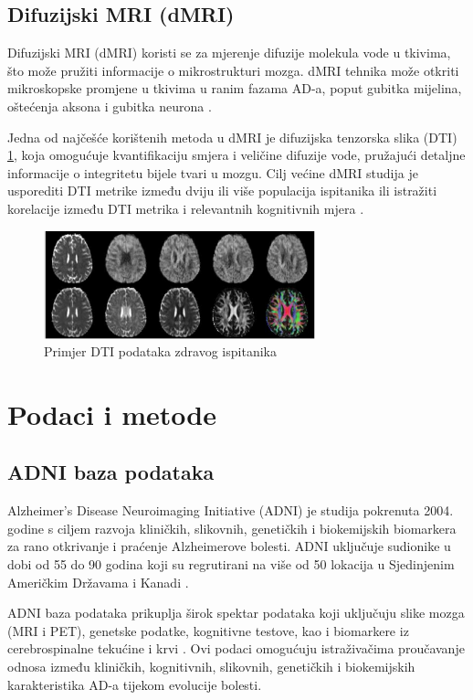 \documentclass[zavrsnirad]{fer}
\begin{document}
\subsection{Difuzijski MRI (dMRI)}
Difuzijski MRI (dMRI) koristi se za mjerenje difuzije molekula vode u tkivima, što može pružiti informacije o mikrostrukturi mozga. dMRI tehnika može otkriti mikroskopske promjene u tkivima u ranim fazama AD-a, poput gubitka mijelina, oštećenja aksona i gubitka neurona \cite{Promteangtrong2015}.

Jedna od najčešće korištenih metoda u dMRI je difuzijska tenzorska slika (DTI) \ref{fig:dMRI}, koja omogućuje kvantifikaciju smjera i veličine difuzije vode, pružajući detaljne informacije o integritetu bijele tvari u mozgu. Cilj većine dMRI studija je usporediti DTI metrike između dviju ili više populacija ispitanika ili istražiti korelacije između DTI metrika i relevantnih kognitivnih mjera \cite{mueller2015diffusion}.

\begin{figure}[h]
	\centering
	\includegraphics[width=0.7\textwidth]{Figures/dMRI.jpg}
	\caption{Primjer DTI podataka zdravog ispitanika \cite{mueller2015diffusion}}
	\label{fig:dMRI}
\end{figure}

\section{Podaci i metode}
\subsection{ADNI baza podataka}
Alzheimer's Disease Neuroimaging Initiative (ADNI) je studija pokrenuta 2004. godine s ciljem razvoja kliničkih, slikovnih, genetičkih i biokemijskih biomarkera za rano otkrivanje i praćenje Alzheimerove bolesti. ADNI uključuje sudionike u dobi od 55 do 90 godina koji su regrutirani na više od 50 lokacija u Sjedinjenim Američkim Državama i Kanadi \cite{adni_about}. 

ADNI baza podataka prikuplja širok spektar podataka koji uključuju slike mozga (MRI i PET), genetske podatke, kognitivne testove, kao i biomarkere iz cerebrospinalne tekućine i krvi \cite{adni_about}. Ovi podaci omogućuju istraživačima proučavanje odnosa između kliničkih, kognitivnih, slikovnih, genetičkih i biokemijskih karakteristika AD-a tijekom evolucije bolesti.
\end{document}
